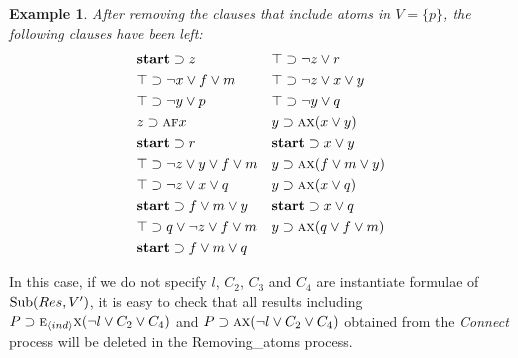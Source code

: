 \documentclass{article}
\newtheorem{example}{Example}
\begin{document}
\begin{example}\label{examp:remA}
After removing the clauses that include atoms in $V=\{p\}$, the following clauses have been left:
\begin{align*}
& \textbf{start}\supset z &&  \top \supset \neg z \vee r\\
& \top \supset \neg x\vee f \vee m &&  \top \supset \neg z \vee x \vee y \\
&  \top \supset \neg y \vee p &&  \top \supset \neg y \vee q\\
&  z \supset \textsc{a} \textsc{f} x &&   y \supset \textsc{a} \textsc{x}(x\vee y) \\
& \textbf{start} \supset r && \textbf{start} \supset x \vee y \\
& \top \supset \neg z \vee y \vee f \vee m && y \supset \textsc{a}\textsc{x}(f\vee m\vee y)\\
& \top \supset \neg z \vee x \vee q && y \supset \textsc{a}\textsc{x}(x\vee q) \\
&  \textbf{start} \supset f\vee m \vee y && \textbf{start} \supset x \vee q \\
& \top \supset q \vee \neg z \vee f \vee m && y \supset \textsc{a}\textsc{x}(q \vee f\vee m) \\
& \textbf{start} \supset f\vee m \vee q
\end{align*}
\end{example}

In this case, if we do not specify $l$, $C_2$, $C_3$  and $C_4$ are instantiate formulae of  $\textrm{Sub}(Res, V')$, it is easy to check that all results including  $P\supset \textsc{e}_{{\langle{ind}\rangle}}\textsc{x} (\neg l \vee C_2 \vee C_4)$ and $P\supset \textsc{a} \textsc{x} (\neg l \vee C_2 \vee C_4)$ obtained from the \emph{Connect} process will be deleted in the Removing\_atoms process.
\end{document}
